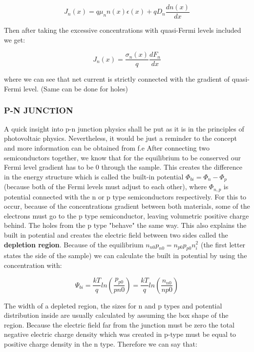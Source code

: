 \begin{equation}
J_n(x) = q\mu _n n(x)\epsilon (x)+ qD_n\frac{dn(x)}{dx}
\end{equation}

Then after taking the excessive concentrations with quasi-Fermi levels included we get:

\begin{equation}
J_n(x) = \frac{\sigma _n (x)}{q}\frac{dF_n}{dx}
\end{equation}

where we can see that net current is strictly connected with the gradient of quasi-Fermi level. (Same can be done for holes)

\subsubsection{P-N JUNCTION}
A quick insight into p-n junction physics shall be put as it is in the principles of photovoltaic physics. Nevertheless, it would be just a reminder to the concept and more information can be obtained from f.e \cite{sze}
After connecting two semiconductors together, we know that for the equilibrium to be conserved our Fermi level gradient has to be 0 through the sample. This creates the difference in the energy structure which is called the built-in  potential $\Phi _{bi} = \Phi _n - \Phi _p$(because both of the Fermi levels must adjust to each other), where $\Phi _{n,p}$ is potential connected with the n or p type semiconductors respectively. For this to occur, because of the concentrations gradient between both materials, some of the electrons must go to the p type semiconductor, leaving volumetric positive charge behind. The holes from the p type "behave" the same way. This also explains the built in potential and creates the electric field between two sides called the\textbf{ depletion region}. Because of the equilibrium $n_{n0}p_{n0}=n_{p0}p_{p0}n_i^2$ (the first letter states the side of the sample) we can calculate the built in potential by using the concentration with:

\begin{equation}
\Psi _{bi} = \frac{kT}{q}ln(\frac{p_{p0}}{p{n0}})=\frac{kT}{q}ln(\frac{n_{n0}}{n{p0}})
\end{equation}

The width of a depleted region, the sizes for n and p types and potential distribution inside are usually calculated by assuming the box shape of the region. Because the electric field far from the junction must be zero the total negative electric charge density which was created in p-type must be equal to positive charge density in the n type. Therefore we can say that:

